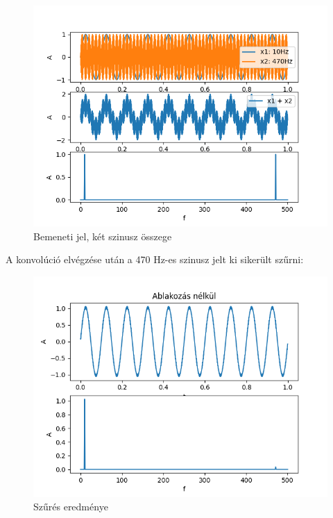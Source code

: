 \begin{figure}[H]
    \centering
    \includegraphics[scale=0.5]{figures/fir_sin.png}
    \caption{Bemeneti jel, két szinusz összege}
\end{figure}

A konvolúció elvégzése után a 470 Hz-es szinusz jelt ki sikerült szűrni: 

\begin{figure}[H]
    \centering
    \includegraphics[scale=0.5]{figures/fir_no_win.png}
    \caption{Szűrés eredménye}
\end{figure}
